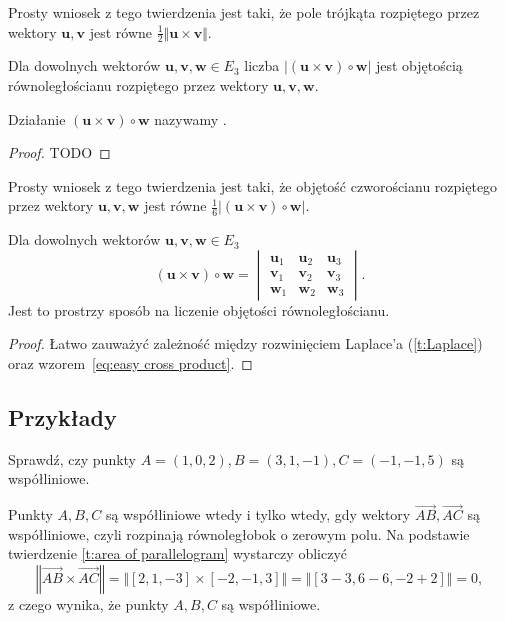 Prosty wniosek z tego twierdzenia jest taki, że pole trójkąta rozpiętego przez wektory $\mathbf{u}, \mathbf{v}$ jest równe $\frac{1}{2}\Vert\mathbf{u}\times\mathbf{v}\Vert$.

\begin{theorem}
    Dla dowolnych wektorów $\mathbf{u}, \mathbf{v}, \mathbf{w} \in E_3$ liczba $|(\mathbf{u}\times\mathbf{v}) \circ \mathbf{w}|$ jest objętością równoległościanu rozpiętego przez wektory $\mathbf{u}, \mathbf{v}, \mathbf{w}$.
\end{theorem}
Działanie $(\mathbf{u}\times\mathbf{v}) \circ \mathbf{w}$ nazywamy .
\begin{proof}
    TODO
\end{proof}

Prosty wniosek z tego twierdzenia jest taki, że objętość czworościanu rozpiętego przez wektory $\mathbf{u}, \mathbf{v}, \mathbf{w}$ jest równe $\frac{1}{6}|(\mathbf{u}\times\mathbf{v}) \circ \mathbf{w}|$.

\begin{fact}
    Dla dowolnych wektorów $\mathbf{u}, \mathbf{v}, \mathbf{w} \in E_3$
    \[ (\mathbf{u}\times\mathbf{v}) \circ \mathbf{w} = \begin{vmatrix}
        \mathbf{u}_1 & \mathbf{u}_2 & \mathbf{u}_3 \\
        \mathbf{v}_1 & \mathbf{v}_2 & \mathbf{v}_3 \\
        \mathbf{w}_1 & \mathbf{w}_2 & \mathbf{w}_3
    \end{vmatrix}. \]
    Jest to prostrzy sposób na liczenie objętości równoległościanu.
\end{fact}
\begin{proof}
    Łatwo zauważyć zależność między rozwinięciem Laplace'a (\ref{t:Laplace}) oraz wzorem~\ref{eq:easy cross product}.
\end{proof}

\subsection{Przykłady}
\begin{example}
    Sprawdź, czy punkty $A = (1, 0, 2), B = (3, 1, -1), C = (-1, -1, 5)$ są współliniowe.
\end{example}
\begin{solution}
    Punkty $A, B, C$ są współliniowe wtedy i tylko wtedy, gdy wektory $\overrightarrow{AB}, \overrightarrow{AC}$ są współliniowe, czyli rozpinają równoległobok o zerowym polu. Na podstawie twierdzenie \ref{t:area of parallelogram} wystarczy obliczyć
    \[ \left\Vert\overrightarrow{AB}\times\overrightarrow{AC}\right\Vert = \Vert[2, 1, -3] \times [-2, -1, 3]\Vert = \Vert[3 - 3, 6 - 6, -2 + 2]\Vert = 0,\]
    z czego wynika, że punkty $A, B, C$ są współliniowe.
\end{solution}